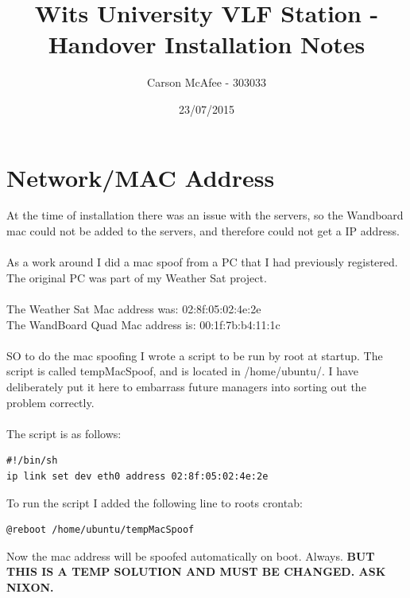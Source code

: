 \documentclass[a4paper,12pt]{article}
\begin{document}
\setcounter{page}{0} %
\vspace{2cm}
\title{ Wits University VLF Station - Handover Installation Notes }
\date{23/07/2015}
\author{Carson McAfee - 303033}
\maketitle
\thispagestyle{fancyheader}


\section{Network/MAC Address}
At the time of installation there was an issue with the servers, so the Wandboard mac could not be added to the servers, and therefore could not get a IP address.\\
\\
As a work around I did a mac spoof from a PC that I had previously registered. The original PC was part of my Weather Sat project. \\
\\
The Weather Sat Mac address was: 	02:8f:05:02:4e:2e\\
The WandBoard Quad Mac address is: 	00:1f:7b:b4:11:1c\\
\\
SO to do the mac spoofing I wrote a script to be run by root at startup. The script is called tempMacSpoof, and is located in /home/ubuntu/. I have deliberately put it here to embarrass future managers into sorting out the problem correctly.\\
\\
The script is as follows:
\begin{verbatim}
#!/bin/sh
ip link set dev eth0 address 02:8f:05:02:4e:2e
\end{verbatim}

To run the script I added the following line to roots crontab:
\begin{verbatim}
@reboot /home/ubuntu/tempMacSpoof
\end{verbatim}

Now the mac address will be spoofed automatically on boot. Always. \textbf{BUT THIS IS A TEMP SOLUTION AND MUST BE CHANGED. ASK NIXON.}
\end{document}
